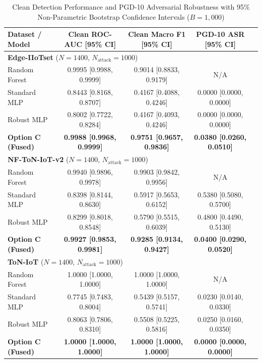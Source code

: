 \begin{table}[htbp]
\caption{Clean Detection Performance and PGD-10 Adversarial Robustness with 95\% Non-Parametric Bootstrap Confidence Intervals ($B=1,000$)}
\label{tab:bootstrap_confidence_intervals}
\centering
\begin{tabular}{lcccc}
\toprule
\textbf{Dataset / Model} & \textbf{Clean ROC-AUC [95\% CI]} & \textbf{Clean Macro F1 [95\% CI]} & \textbf{PGD-10 ASR [95\% CI]} \\
\midrule
\multicolumn{4}{l}{\textbf{Edge-IIoTset} ($N=1400$, $N_{\text{attack}}=1000$)} \\
\quad Random Forest & 0.9995 [0.9988, 0.9999] & 0.9014 [0.8833, 0.9179] & N/A \\
\quad Standard MLP & 0.8443 [0.8168, 0.8707] & 0.4167 [0.4088, 0.4246] & 0.0000 [0.0000, 0.0000] \\
\quad Robust MLP & 0.8002 [0.7722, 0.8284] & 0.4167 [0.4093, 0.4246] & 0.0000 [0.0000, 0.0000] \\
\quad \textbf{Option C (Fused)} & \textbf{0.9988 [0.9968, 0.9999]} & \textbf{0.9751 [0.9657, 0.9836]} & \textbf{0.0380 [0.0260, 0.0510]} \\
\midrule
\multicolumn{4}{l}{\textbf{NF-ToN-IoT-v2} ($N=1400$, $N_{\text{attack}}=1000$)} \\
\quad Random Forest & 0.9940 [0.9896, 0.9978] & 0.9903 [0.9842, 0.9956] & N/A \\
\quad Standard MLP & 0.8398 [0.8144, 0.8630] & 0.5917 [0.5653, 0.6152] & 0.5380 [0.5080, 0.5700] \\
\quad Robust MLP & 0.8299 [0.8018, 0.8548] & 0.5790 [0.5515, 0.6039] & 0.4800 [0.4490, 0.5130] \\
\quad \textbf{Option C (Fused)} & \textbf{0.9927 [0.9853, 0.9981]} & \textbf{0.9285 [0.9134, 0.9427]} & \textbf{0.0400 [0.0290, 0.0520]} \\
\midrule
\multicolumn{4}{l}{\textbf{ToN-IoT} ($N=1400$, $N_{\text{attack}}=1000$)} \\
\quad Random Forest & 1.0000 [1.0000, 1.0000] & 1.0000 [1.0000, 1.0000] & N/A \\
\quad Standard MLP & 0.7745 [0.7483, 0.8004] & 0.5439 [0.5157, 0.5741] & 0.0230 [0.0140, 0.0330] \\
\quad Robust MLP & 0.8063 [0.7806, 0.8310] & 0.5508 [0.5225, 0.5816] & 0.0250 [0.0160, 0.0350] \\
\quad \textbf{Option C (Fused)} & \textbf{1.0000 [1.0000, 1.0000]} & \textbf{1.0000 [1.0000, 1.0000]} & \textbf{0.0000 [0.0000, 0.0000]} \\

\end{tabular}
\end{table}
